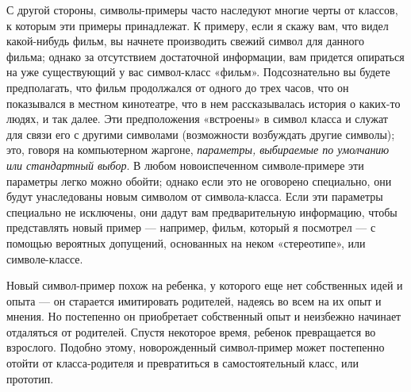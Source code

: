 \documentclass[../main.tex]{subfiles}
\begin{document}
С другой стороны, символы-примеры часто наследуют многие черты от классов, к которым эти примеры принадлежат. К примеру, если я скажу вам, что видел какой-нибудь фильм, вы начнете производить свежий символ для данного фильма; однако за отсутствием достаточной информации, вам придется опираться на уже существующий у вас символ-класс «фильм». Подсознательно вы будете предполагать, что фильм продолжался от одного до трех часов, что он показывался в местном кинотеатре, что в нем рассказывалась история о каких-то людях, и так далее. Эти предположения «встроены» в символ класса и служат для связи его с другими символами (возможности возбуждать другие символы); это, говоря на компьютерном жаргоне, \emph{параметры, выбираемые по умолчанию или стандартный выбор}. В любом новоиспеченном символе-примере эти параметры легко можно обойти; однако если это не оговорено специально, они будут унаследованы новым символом от символа-класса. Если эти параметры специально не исключены, они дадут вам предварительную информацию, чтобы представлять новый пример --- например, фильм, который я посмотрел --- с помощью вероятных допущений, основанных на неком «стереотипе», или символе-классе.

Новый символ-пример похож на ребенка, у которого еще нет собственных идей и опыта --- он старается имитировать родителей, надеясь во всем на их опыт и мнения. Но постепенно он приобретает собственный опыт и неизбежно начинает отдаляться от родителей. Спустя некоторое время, ребенок превращается во взрослого. Подобно этому, новорожденный символ-пример может постепенно отойти от класса-родителя и превратиться в самостоятельный класс, или прототип.
\end{document}
